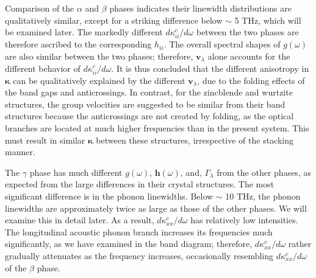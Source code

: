 \documentclass[twocolumn,amsmath,amssymb,a4paper,prb,superscriptaddress,floatfix]{revtex4-1}
\begin{document}
Comparison of the $\alpha$ and $\beta$ phases indicates their linewidth
distributions are qualitatively similar, except for a striking difference below
$\sim$ 5 THz, which will be examined later. The markedly different
$d\kappa_{ii}^c/d\omega$ between the two phases are therefore ascribed to the
corresponding $h_{ii}$. The overall spectral shapes of $g(\omega)$ are also
similar between the two phases; therefore, $\mathbf{v}_\lambda$ alone accounts
for the different behavior of $d\kappa_{ii}^c/d\omega$. It is thus concluded
that the different anisotropy in $\boldsymbol{\kappa}$ can be qualitatively
explained by the different $\mathbf{v}_\lambda$, due to the folding effects of
the band gaps and anticrossings. In contrast, for the zincblende and wurtzite
structures, the group velocities are suggested to be similar from their band
structures\cite{phono3py} because the anticrossings are not created by folding,
as the optical branches are located at much higher frequencies than in the
present system. This must result in similar $\boldsymbol{\kappa}$ between these
structures, irrespective of the stacking manner. 

The $\gamma$ phase has much different $g(\omega)$, $\boldsymbol{h}(\omega)$,
and, $\Gamma_\lambda$ from the other phases, as expected from the large
differences in their crystal structures. The most significant difference is in
the phonon linewidths. Below $\sim$ 10 THz, the phonon linewidths are approximately
twice as large as those of the other phases. We will examine this in detail
later. As a result, $d\kappa_{xx}^c/d\omega$ has relatively low intensities. The
longitudinal acoustic phonon branch increases its frequencies much
significantly, as we have examined in the band diagram; therefore,
$d\kappa_{xx}^c/d\omega$ rather gradually attenuates as the frequency increases,
occasionally resembling $d\kappa_{xx}^c/d\omega$ of the $\beta$ phase.
\end{document}

